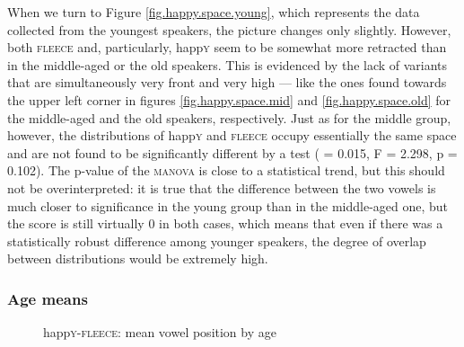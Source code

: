 When we turn to Figure \ref{fig.happy.space.young}, which represents the data collected from the youngest speakers, the picture changes only slightly.
However, both \textsc{fleece} and, particularly, happ\textsc{y} seem to be somewhat more retracted than in the middle-aged or the old speakers.
This is evidenced by the lack of variants that are simultaneously very front and very high --- like the ones found towards the upper left corner in figures \ref{fig.happy.space.mid} and \ref{fig.happy.space.old} for the middle-aged and the old speakers, respectively.
Just as for the middle group, however, the distributions of happ\textsc{y} and \textsc{fleece} occupy essentially the same space and are not found to be significantly different by a  test ( = 0.015, F = 2.298, p = 0.102).
The p-value of the \textsc{manova} is close to a statistical trend, but this should not be overinterpreted: it is true that the difference between the two vowels is much closer to significance in the young group than in the middle-aged one, but the  score is still virtually 0 in both cases, which means that even if there was a statistically robust difference among younger speakers, the degree of overlap between  distributions would be extremely high.

\subsubsection{Age means}

\begin{figure}[h!]
	\centering
	
	\caption{happ\textsc{y}-\textsc{fleece}: mean vowel position by age}
	\label{fig.happy.space.means}
\end{figure}

